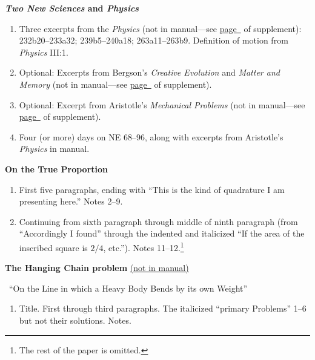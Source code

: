\documentclass[10pt]{article}
\begin{document}
\textbf{\emph{Two New Sciences} and \emph{Physics}}
\begin{enumerate}[noitemsep]
	\item Three excerpts from the \emph{Physics} (not
		in manual---see 
		\hyperref[supple.1]{page~\pageref{supple.1}}
		of supplement):
		232b20--233a32; 239b5--240a18;
		263a11--263b9. Definition of motion from
		\emph{Physics} III:1. 
	\item Optional: Excerpts from Bergson's \emph{Creative Evolution} and
		\emph{Matter and Memory} (not in
		manual---see
		\hyperref[supple.7]{page~\pageref{supple.7}}
		of supplement).
	\item Optional: Excerpt from Aristotle's \emph{Mechanical
			Problems} (not in manual---see
		\hyperref[supple.4]{page~\pageref{supple.4}}
		of supplement).
	\item Four (or more) days on NE 68--96, along with
		excerpts from Aristotle's \emph{Physics} in
		manual.
\end{enumerate}
\textbf{On the True Proportion}
	\label{LeibnizProp}
	\begin{enumerate}[noitemsep]
		\item First five paragraphs, ending with ``This is
	the kind of quadrature I am presenting here.'' Notes
	2--9. \item Continuing from sixth paragraph
	through middle of ninth paragraph (from
	``Accordingly I found'' through the indented and
	italicized ``If the area of the
	inscribed square is $2/4$, etc.''). Notes
	11--12.\footnote{The rest of the paper is omitted.}
\end{enumerate}
\textbf{The Hanging Chain problem} \href{https://drive.google.com/file/d/1Q06ypQH26GPMVsxn8SRQVEEn79qmUxOE/view?usp=sharing}{(not in manual)}
\label{LeibnizHang}

\ ``On the Line in which a Heavy Body Bends
by its own Weight''
\begin{enumerate}[noitemsep]  \item Title.
		First through third paragraphs. The
		italicized ``primary Problems'' 1--6 but not
		their solutions. Notes.  \end{enumerate} 
\end{document}
